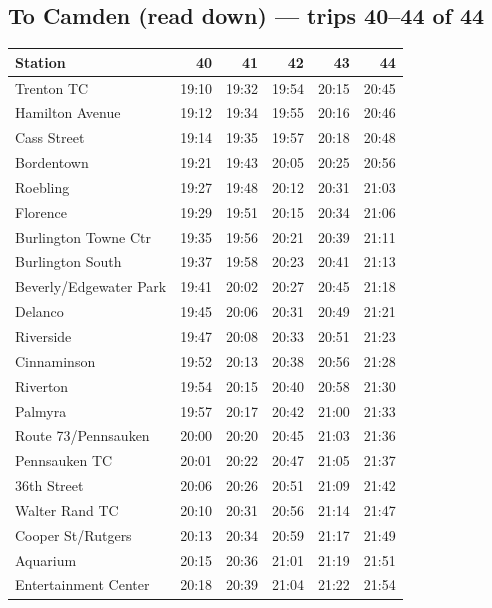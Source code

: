 \subsection*{To Camden (read down) --- trips 40--44 of 44}
\begin{center}\footnotesize\setlength{\tabcolsep}{3pt}\begin{tabular}{@{}lrrrrr@{}}\toprule
Station & 40 & 41 & 42 & 43 & 44 \\\midrule
Trenton TC & 19:10 & 19:32 & 19:54 & 20:15 & 20:45 \\
Hamilton Avenue & 19:12 & 19:34 & 19:55 & 20:16 & 20:46 \\
Cass Street & 19:14 & 19:35 & 19:57 & 20:18 & 20:48 \\
Bordentown & 19:21 & 19:43 & 20:05 & 20:25 & 20:56 \\
Roebling & 19:27 & 19:48 & 20:12 & 20:31 & 21:03 \\
Florence & 19:29 & 19:51 & 20:15 & 20:34 & 21:06 \\
Burlington Towne Ctr & 19:35 & 19:56 & 20:21 & 20:39 & 21:11 \\
Burlington South & 19:37 & 19:58 & 20:23 & 20:41 & 21:13 \\
Beverly/Edgewater Park & 19:41 & 20:02 & 20:27 & 20:45 & 21:18 \\
Delanco & 19:45 & 20:06 & 20:31 & 20:49 & 21:21 \\
Riverside & 19:47 & 20:08 & 20:33 & 20:51 & 21:23 \\
Cinnaminson & 19:52 & 20:13 & 20:38 & 20:56 & 21:28 \\
Riverton & 19:54 & 20:15 & 20:40 & 20:58 & 21:30 \\
Palmyra & 19:57 & 20:17 & 20:42 & 21:00 & 21:33 \\
Route 73/Pennsauken & 20:00 & 20:20 & 20:45 & 21:03 & 21:36 \\
Pennsauken TC & 20:01 & 20:22 & 20:47 & 21:05 & 21:37 \\
36th Street & 20:06 & 20:26 & 20:51 & 21:09 & 21:42 \\
Walter Rand TC & 20:10 & 20:31 & 20:56 & 21:14 & 21:47 \\
Cooper St/Rutgers & 20:13 & 20:34 & 20:59 & 21:17 & 21:49 \\
Aquarium & 20:15 & 20:36 & 21:01 & 21:19 & 21:51 \\
Entertainment Center & 20:18 & 20:39 & 21:04 & 21:22 & 21:54 \\
\bottomrule\end{tabular}\end{center}
\clearpage
